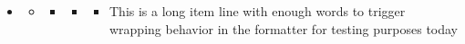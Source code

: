 \documentclass{article}
\begin{document}
\begin{itemize}
        \item
                \begin{itemize}
                        \item
                                \begin{itemize}
                                        \item
                                                \begin{itemize}
                                                        \item
                                                                \begin{itemize}
                                                                        \item This is a long item line with enough words to trigger wrapping behavior in the formatter for testing purposes today
                                                                \end{itemize}
                                                \end{itemize}
                                \end{itemize}
                \end{itemize}
\end{itemize}
\end{document}
